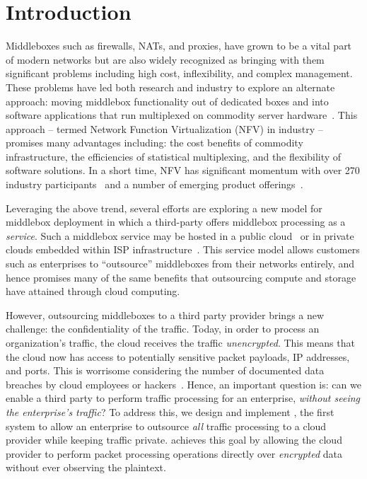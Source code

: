\section{Introduction}\label{sec:intro}

Middleboxes such as firewalls, NATs, and proxies, have grown to be a vital part of modern networks but are 
also widely recognized as bringing  with them significant problems including high cost, inflexibility, and complex management.  
These problems have led both research and industry to explore an alternate approach: moving middlebox functionality out of dedicated boxes and into 
software applications that run multiplexed on commodity server hardware~\cite{mb-manifesto,comb,aplomb,opennf,clickos,flowtags,nfv,domain20,opnfv}.
This approach -- termed Network Function Virtualization (NFV) in industry -- promises many advantages including: the cost benefits of commodity infrastructure, 
the efficiencies of statistical multiplexing, and the flexibility of software solutions. 
In a short time, NFV has significant momentum with over 270 industry participants~\cite{etsi-nfv} and a number of emerging product offerings~\cite{something}.

Leveraging the above trend, several efforts are exploring a new model for middlebox deployment in which a third-party offers middlebox processing as a  
\emph{service}.
Such a middlebox service may be hosted in a public cloud~\cite{aplomb,zscalar,aryaka} or in private clouds embedded within ISP 
infrastructure~\cite{domain20, telefonica, find-more}.  
This service model allows customers such as enterprises to ``outsource'' middleboxes from their networks entirely, and hence promises many of the same 
benefits that outsourcing compute and storage have attained through cloud computing.%

However, outsourcing middleboxes to a third party provider brings a new challenge: the confidentiality of the traffic. 
Today, in order to process an organization's traffic, the cloud receives the traffic {\em unencrypted}.  This means that the cloud 
now has access to potentially sensitive packet payloads,  IP addresses, and ports. This is 
worrisome considering the number of documented data breaches by cloud employees or hackers~\cite{PrivacyRecords}.
Hence, an important question is: can we enable a third party to perform traffic processing for an enterprise, {\em without seeing the enterprise's traffic}?
To address this, we design and implement \sys, the first system to allow an enterprise to outsource {\it all} traffic processing to a cloud provider while keeping traffic private. 
\sys achieves this goal by allowing the cloud provider to perform packet processing operations directly over {\it encrypted} data without ever observing the plaintext.


